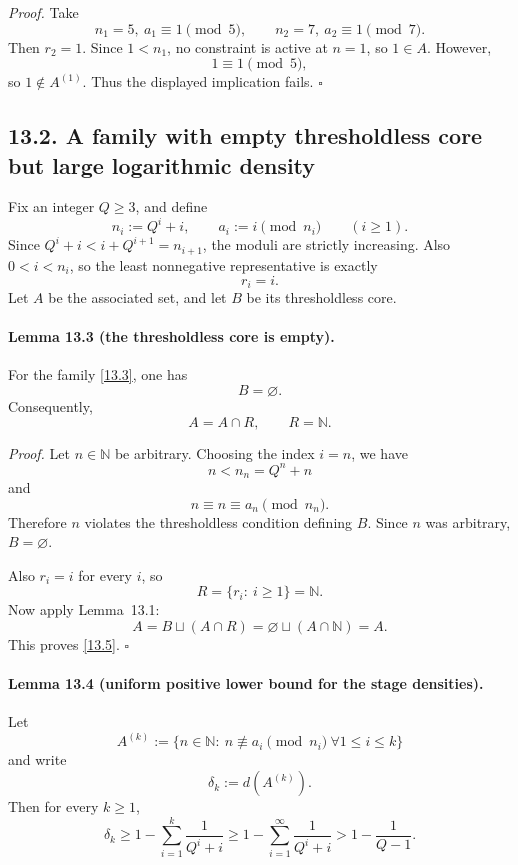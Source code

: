 \emph{Proof.}
Take
\[
n_1=5,\ a_1\equiv 1\pmod 5,
\qquad
n_2=7,\ a_2\equiv 1\pmod 7.
\]
Then \(r_2=1\).  Since \(1<n_1\), no constraint is active at \(n=1\), so \(1\in A\).  However,
\[
1\equiv 1\pmod 5,
\]
so \(1\notin A^{(1)}\).  Thus the displayed implication fails. \hfill \(\square\)

\subsection*{13.2. A family with empty thresholdless core but large logarithmic density}
Fix an integer \(Q\ge 3\), and define
\begin{equation}
n_i:=Q^i+i,
\qquad
 a_i:=i \pmod{n_i}
\qquad (i\ge 1).
\tag{13.3}
\end{equation}
Since \(Q^i+i<i+Q^{i+1}=n_{i+1}\), the moduli are strictly increasing.  Also \(0<i<n_i\), so the least nonnegative representative is exactly
\[
r_i=i.
\]
Let \(A\) be the associated set, and let \(B\) be its thresholdless core.

\paragraph{Lemma 13.3 (the thresholdless core is empty).}
For the family \eqref{13.3}, one has
\begin{equation}
B=\varnothing.
\tag{13.4}
\end{equation}
Consequently,
\begin{equation}
A=A\cap R,
\qquad
R=\mathbb N.
\tag{13.5}
\end{equation}

\emph{Proof.}
Let \(n\in\mathbb N\) be arbitrary.  Choosing the index \(i=n\), we have
\[
n<n_n=Q^n+n
\]
and
\[
n\equiv n\equiv a_n\pmod{n_n}.
\]
Therefore \(n\) violates the thresholdless condition defining \(B\).  Since \(n\) was arbitrary, \(B=\varnothing\).

Also \(r_i=i\) for every \(i\), so
\[
R=\{r_i:\ i\ge 1\}=\mathbb N.
\]
Now apply Lemma~13.1:
\[
A=B\sqcup (A\cap R)=\varnothing\sqcup (A\cap\mathbb N)=A.
\]
This proves \eqref{13.5}. \hfill \(\square\)

\paragraph{Lemma 13.4 (uniform positive lower bound for the stage densities).}
Let
\[
A^{(k)}:=\{n\in\mathbb N:\ n\not\equiv a_i\pmod{n_i}\ \forall 1\le i\le k\}
\]
and write
\[
\delta_k:=d(A^{(k)}).
\]
Then for every \(k\ge 1\),
\begin{equation}
\delta_k\ge 1-\sum_{i=1}^{k}\frac1{Q^i+i}
\ge 1-\sum_{i=1}^{\infty}\frac1{Q^i+i}
>1-\frac1{Q-1}.
\tag{13.6}
\end{equation}

